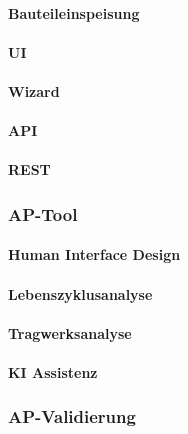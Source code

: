 \documentclass[type=zwischenbericht]{zukunftbau}
\begin{document}
\paragraph{Bauteileinspeisung}
\begin{SemioNest}
\paragraph{UI}
\begin{SemioNest}
\paragraph{Wizard}
\end{SemioNest}
\paragraph{API}
\begin{SemioNest}
\paragraph{REST}
\end{SemioNest}
\end{SemioNest}

\subsubsection{AP-Tool}

\paragraph{Human Interface Design}

\paragraph{Lebenszyklusanalyse}

\paragraph{Tragwerksanalyse}

\paragraph{KI Assistenz}

\subsubsection{AP-Validierung}
\end{document}
